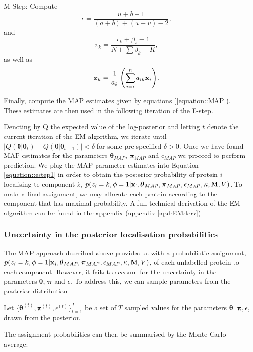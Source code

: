 \documentclass[12pt,english]{article}\usepackage[]{graphicx}\usepackage[]{color}
\begin{document}
M-Step: Compute
\[\epsilon = \frac{ u + b - 1}{(a+b) + (u+v) - 2},\]
and
\[\pi_k = \frac{r_k + \beta_k - 1}{N + \sum \beta_k - K},\]
as well as
\[\bar{\boldsymbol{x}}_k = \frac{1}{a_k}\left(\sum_{i=i}^{n}a_{ik}{\bf x}_i\right).\]

Finally, compute the MAP estimates given by equations
(\ref{equation::MAP}). These estimates are then used in the following
iteration of the E-step.


Denoting by Q the expected value of the log-posterior and letting $t$
denote the current iteration of the EM algorithm, we iterate until
$\lvert Q(\boldsymbol{\theta}|\boldsymbol{\theta}_{t}) -
Q(\boldsymbol{\theta}|\boldsymbol{\theta}_{t-1})\rvert < \delta$ for
some pre-specified $\delta >0$.  Once we have found MAP estimates for
the parameters $\boldsymbol{\theta}_{MAP}$, $\boldsymbol{\pi}_{MAP}$
and $\epsilon_{MAP}$ we proceed to perform prediction. We plug the MAP
parameter estimates into Equation \eqref{equation::estep1} in order to
obtain the posterior probability of protein $i$ localising to
component $k$,
$p(z_i = k, \phi = 1 | {\bf x}_i, \boldsymbol{\theta}_{MAP},
\boldsymbol{\pi}_{MAP} , \epsilon_{MAP},\kappa, {\bf M}, V)$. To make
a final assignment, we may allocate each protein according to the
component that has maximal probability.  A full technical derivation
of the EM algorithm can be found in the appendix (appendix
\ref{apd:EMderv}).

\subsubsection{Uncertainty in the posterior localisation probabilities}\label{section::MCMC}

The MAP approach described above provides us with a probabilistic
assignment,
$p(z_i = k, \phi = 1 | {\bf x}_i, \boldsymbol{\theta}_{MAP},
\boldsymbol{\pi}_{MAP} , \epsilon_{MAP},\kappa, {\bf M}, V)$, of each
unlabelled protein to each component.  However, it fails to account
for the uncertainty in the parameters $\boldsymbol{\theta}$,
$\boldsymbol{\pi}$ and $\epsilon$. To address this, we can sample
parameters from the posterior distribution.

Let
$\{\boldsymbol{\theta}^{(t)}, \boldsymbol{\pi}^{(t)},
\epsilon^{(t)}\}_{t=1}^T$ be a set of $T$ sampled values for the
parameters $\boldsymbol{\theta}$, $\boldsymbol{\pi}, \epsilon$, drawn
from the posterior.


The assignment probabilities can then be summarised by the Monte-Carlo
average:
\end{document}
